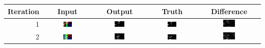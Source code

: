 \documentclass[twoside]{article}
\begin{document}
\begin{multicols}{2}
\begin{table}
\begin{tabular}{| r | c | c | c | c |}
\hline
Iteration & Input & Output & Truth & Difference \\ \hline
1 & 
\includegraphics[width=0.2\textwidth]{images/8x8/1/in} &
\includegraphics[width=0.2\textwidth]{images/8x8/1/out} &
\includegraphics[width=0.2\textwidth]{images/8x8/1/truth} &
\includegraphics[width=0.2\textwidth]{images/8x8/1/dif} \\ \hline
2 & 
\includegraphics[width=0.2\textwidth]{images/8x8/2/in} &
\includegraphics[width=0.2\textwidth]{images/8x8/2/out} &
\includegraphics[width=0.2\textwidth]{images/8x8/2/truth} &
\includegraphics[width=0.2\textwidth]{images/8x8/2/dif} \\ \hline

\end{tabular}
\end{table}
\end{multicols}
\end{document}
